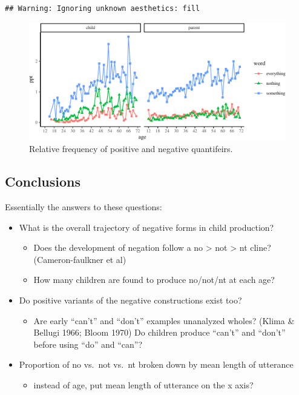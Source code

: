 \documentclass[man,floatsintext,draftall]{apa6}
\providecommand{\tightlist}{%
  \setlength{\itemsep}{0pt}\setlength{\parskip}{0pt}}
\begin{document}
\begin{verbatim}
## Warning: Ignoring unknown aesthetics: fill
\end{verbatim}

\begin{figure}
\centering
\includegraphics{negation_production_files/figure-latex/quantifiers-1.pdf}
\caption{\label{fig:quantifiers}Relative frequency of positive and negative quantifeirs.}
\end{figure}

\hypertarget{conclusions}{%
\subsection{Conclusions}\label{conclusions}}

Essentially the answers to these questions:

\begin{itemize}
\tightlist
\item
  What is the overall trajectory of negative forms in child production?

  \begin{itemize}
  \tightlist
  \item
    Does the development of negation follow a no \textgreater{} not \textgreater{} nt cline? (Cameron-faulkner et al)
  \item
    How many children are found to produce no/not/nt at each age?
  \end{itemize}
\item
  Do positive variants of the negative constructions exist too?

  \begin{itemize}
  \tightlist
  \item
    Are early \enquote{can't} and \enquote{don't} examples unanalyzed wholes? (Klima \& Bellugi 1966; Bloom 1970) Do children produce \enquote{can't} and \enquote{don't} before using \enquote{do} and \enquote{can}?
  \end{itemize}
\item
  Proportion of no vs.~not vs.~nt broken down by mean length of utterance

  \begin{itemize}
  \tightlist
  \item
    instead of age, put mean length of utterance on the x axis?
  \end{itemize}
\end{itemize}
\end{document}
